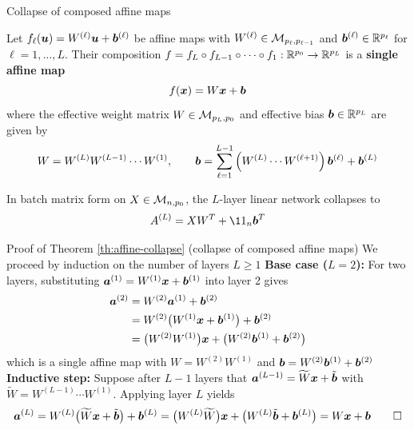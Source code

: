 \documentclass[aspectratio=169]{beamer}\usepackage[]{graphicx}\usepackage[]{xcolor}
\begin{document}
\begin{frame}{Collapse of composed affine maps}
\begin{importanttheorem}
\label{th:affine-collapse}
Let $f_\ell(\bm{u}) = W^{(\ell)} \bm{u} + \bm{b}^{(\ell)}$ be affine maps with $W^{(\ell)} \in \mathcal{M}_{p_\ell, p_{\ell-1}}$ and $\bm{b}^{(\ell)} \in \mathbb{R}^{p_\ell}$ for $\ell = 1, \ldots, L$. Their composition $f = f_L \circ f_{L-1} \circ \cdots \circ f_1 : \mathbb{R}^{p_0} \to \mathbb{R}^{p_L}$ is a \textbf{single affine map}
\[
f(\bm{x}) = W \bm{x} + \bm{b}
\]
where the effective weight matrix $W \in \mathcal{M}_{p_L, p_0}$ and effective bias $\bm{b} \in \mathbb{R}^{p_L}$ are given by
\[
W = W^{(L)} W^{(L-1)} \cdots W^{(1)}, \qquad
\bm{b} = \sum_{\ell=1}^{L-1} \left(W^{(L)} \cdots W^{(\ell+1)}\right) \bm{b}^{(\ell)} + \bm{b}^{(L)}
\]
\end{importanttheorem}
\vfill
In batch matrix form on $X \in \mathcal{M}_{n, p_0}$, the $L$-layer linear network collapses to
\[
A^{(L)} = X W^T + \11_n \bb^T
\]
\end{frame}


\begin{frame}[red]{Proof of Theorem \ref{th:affine-collapse} (collapse of composed affine maps)}
We proceed by induction on the number of layers $L \ge 1$
\vfill
\textbf{Base case ($L = 2$):} For two layers, substituting $\bm{a}^{(1)} = W^{(1)} \bm{x} + \bm{b}^{(1)}$ into layer 2 gives
\begin{align*}
\bm{a}^{(2)} &= W^{(2)} \bm{a}^{(1)} + \bm{b}^{(2)} \\
&= W^{(2)}\big(W^{(1)} \bm{x} + \bm{b}^{(1)}\big) + \bm{b}^{(2)} \\
&= \big(W^{(2)} W^{(1)}\big) \bm{x} + \big(W^{(2)} \bm{b}^{(1)} + \bm{b}^{(2)}\big)
\end{align*}
which is a single affine map with $W = W^{(2)} W^{(1)}$ and $\bm{b} = W^{(2)} \bm{b}^{(1)} + \bm{b}^{(2)}$
\vfill
\textbf{Inductive step:} Suppose after $L-1$ layers that $\bm{a}^{(L-1)} = \widetilde{W} \bm{x} + \tilde{\bm{b}}$ with $\widetilde{W} = W^{(L-1)} \cdots W^{(1)}$. Applying layer $L$ yields
\[
\bm{a}^{(L)} = W^{(L)}\big(\widetilde{W} \bm{x} + \tilde{\bm{b}}\big) + \bm{b}^{(L)}
= \big(W^{(L)} \widetilde{W}\big) \bm{x} + \big(W^{(L)} \tilde{\bm{b}} + \bm{b}^{(L)}\big) = W \bm{x} + \bm{b} \qed
\]
\end{frame}
\end{document}

